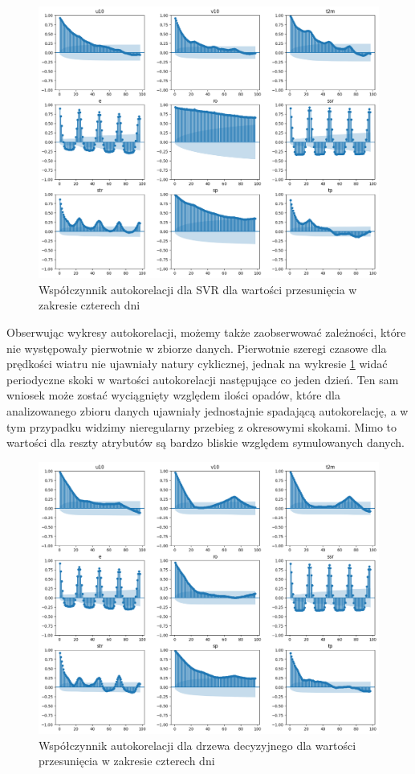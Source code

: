 \begin{figure}[H]
    \centering
    \includegraphics[width=.8\textwidth]{images/svr_autocorr.png}
    \caption{Współczynnik autokorelacji dla SVR dla wartości przesunięcia w zakresie czterech dni}
    \label{svr-autocorr}
\end{figure}

Obserwując wykresy autokorelacji, możemy także zaobserwować zależności, które nie występowały pierwotnie w 
zbiorze danych. Pierwotnie szeregi czasowe dla prędkości wiatru nie ujawniały natury cyklicznej, jednak 
na wykresie \ref{svr-autocorr} widać periodyczne skoki w wartości autokorelacji następujące co jeden dzień.
Ten sam wniosek może zostać wyciągnięty względem ilości opadów, które dla analizowanego zbioru danych 
ujawniały jednostajnie spadającą autokorelację, a w tym przypadku widzimy nieregularny przebieg z okresowymi
skokami. Mimo to wartości dla reszty atrybutów są bardzo bliskie względem symulowanych danych.

\begin{figure}[H]
    \centering
    \includegraphics[width=\textwidth]{images/dt_autocorr.png}
    \caption{Współczynnik autokorelacji dla drzewa decyzyjnego dla wartości przesunięcia w zakresie czterech dni}
    \label{dt-autocorr}
\end{figure}

